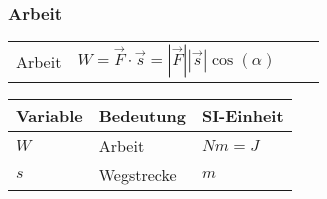 \subsubsection{Arbeit}

\begin{tabbing}
	\begin{tabu} to \linewidth {l X l X}
		\toprule
		Arbeit & $W = \vec F \cdot \vec s = |\vec F| |\vec s| \cos(\alpha)\,$  &
		& \\
	\end{tabu}
\end{tabbing}

\begin{tabbing}
	\begin{tabu} to \linewidth {l X l}
		Variable & Bedeutung & SI-Einheit \\
		\midrule
		$W$ & Arbeit & $Nm = J$ \\
		$s$ & Wegstrecke & $m$ \\
		\bottomrule
	\end{tabu}
\end{tabbing}